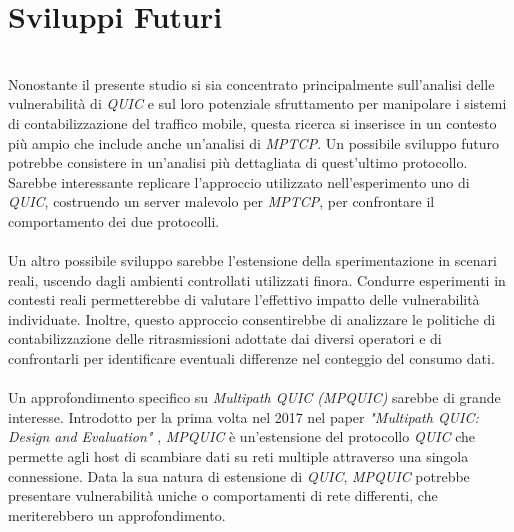 \section{Sviluppi Futuri}
~\\
\indent Nonostante il presente studio si sia concentrato principalmente sull'analisi delle vulnerabilità di \emph{QUIC} e sul loro potenziale sfruttamento per manipolare i sistemi di contabilizzazione del traffico mobile, questa ricerca si inserisce in un contesto più ampio che include anche un'analisi di \emph{MPTCP}.
Un possibile sviluppo futuro potrebbe consistere in un'analisi più dettagliata di quest'ultimo protocollo.
Sarebbe interessante replicare l'approccio utilizzato nell'esperimento uno di \emph{QUIC}, costruendo un server malevolo per \emph{MPTCP},
per confrontare il comportamento dei due protocolli.
\\\\
Un altro possibile sviluppo sarebbe l'estensione della sperimentazione in scenari reali, uscendo dagli ambienti controllati utilizzati finora. 
Condurre esperimenti in contesti reali permetterebbe di valutare l'effettivo impatto delle vulnerabilità individuate. 
Inoltre, questo approccio consentirebbe di analizzare le politiche di contabilizzazione delle ritrasmissioni adottate dai diversi operatori 
e di confrontarli per identificare eventuali differenze nel conteggio del consumo dati.
\\\\
Un approfondimento specifico su \emph{Multipath QUIC (MPQUIC)} sarebbe di grande interesse. 
Introdotto per la prima volta nel 2017 nel paper \emph{"Multipath QUIC: Design and Evaluation"} \cite{article:mpquic},
\emph{MPQUIC} è un'estensione del protocollo \emph{QUIC} che permette agli host di scambiare dati su reti multiple attraverso una singola connessione.
Data la sua natura di estensione di \emph{QUIC},
\emph{MPQUIC} potrebbe presentare vulnerabilità uniche o comportamenti di rete differenti, che meriterebbero un approfondimento.
